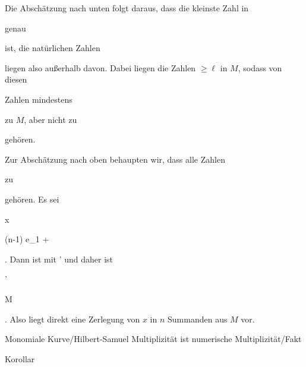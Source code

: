 {


Die Abschätzung nach unten folgt daraus, dass die kleinste Zahl in

 genau

 ist, die natürlichen Zahlen

 liegen also außerhalb davon. Dabei liegen die Zahlen $\geq \ell$ in $M$, sodass von diesen

 Zahlen mindestens

 zu $M$, aber nicht zu

 gehören.


Zur Abschätzung nach oben behaupten wir, dass alle Zahlen

 zu

 gehören. Es sei


\mavergleichskette

{\vergleichskette

{ x
}

{ \geq }{ (n-1) e_1 + \ell
}

{  }{
}

{    }{
}

{   }{
}

}
{}{}{.}
Dann ist   {  mit  }  {  \ell' \geq \ell  }{ } und daher ist


\mavergleichskette

{\vergleichskette

{ \ell'
}

{ \in }{ M
}

{  }{
}

{    }{
}

{   }{
}

}
{}{}{.}
Also liegt direkt eine Zerlegung von $x$ in $n$ Summanden aus $M$ vor.


}



{Monomiale Kurve/Hilbert-Samuel Multiplizität ist numerische Multiplizität/Fakt}

{Korollar}

{}

